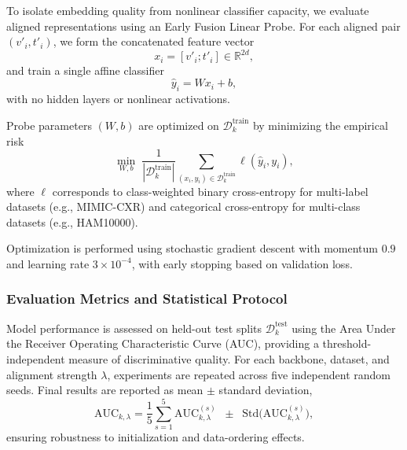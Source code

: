 \documentclass[runningheads]{llncs}
\begin{document}
To isolate embedding quality from nonlinear classifier capacity, we evaluate aligned representations using an Early Fusion Linear Probe. For each aligned pair $(v'_i,t'_i)$, we form the concatenated feature vector
\begin{equation}
x_i = [v'_i;t'_i]\in\mathbb{R}^{2d},
\end{equation}
and train a single affine classifier
\begin{equation}
\hat{y}_i = Wx_i+b,
\label{eq:probe_classifier}
\end{equation}
with no hidden layers or nonlinear activations.

Probe parameters $(W,b)$ are optimized on $\mathcal{D}_k^{\text{train}}$ by minimizing the empirical risk
\begin{equation}
\min_{W,b}\;
\frac{1}{|\mathcal{D}_k^{\text{train}}|}
\sum_{(x_i,y_i)\in\mathcal{D}_k^{\text{train}}}
\ell(\hat{y}_i,y_i),
\label{eq:erm_probe}
\end{equation}
where $\ell$ corresponds to class-weighted binary cross-entropy for multi-label datasets (e.g., MIMIC-CXR) and categorical cross-entropy for multi-class datasets (e.g., HAM10000). 

Optimization is performed using stochastic gradient descent with momentum $0.9$ and learning rate $3\times 10^{-4}$, with early stopping based on validation loss.


\subsubsection{Evaluation Metrics and Statistical Protocol}
\label{sec:metrics_protocol}

Model performance is assessed on held-out test splits $\mathcal{D}_k^{\text{test}}$ using the Area Under the Receiver Operating Characteristic Curve (AUC), providing a threshold-independent measure of discriminative quality. For each backbone, dataset, and alignment strength $\lambda$, experiments are repeated across five independent random seeds. Final results are reported as mean $\pm$ standard deviation,
\begin{equation}
\mathrm{AUC}_{k,\lambda} =
\frac{1}{5}\sum_{s=1}^5 \mathrm{AUC}_{k,\lambda}^{(s)}
\;\;\pm\;\;
\mathrm{Std}\big(\mathrm{AUC}_{k,\lambda}^{(s)}\big),
\end{equation}
ensuring robustness to initialization and data-ordering effects.
\end{document}
